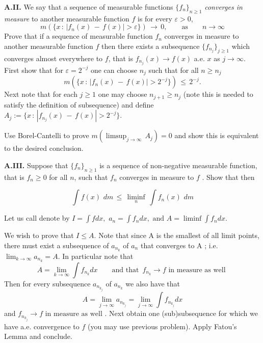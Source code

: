 {\medskip

{\bf A.II.} We say that a sequence of measurable functions $\{f_n\}_{n\geq 1}$ {\it converges in measure} to another measurable function $f$ is for every $\varepsilon >0$, 
$$ m(\{ x \,:\, |f_n(x) \,- \, f(x)| > \varepsilon \} ) \, \to \, 0, \qquad \text{as} \qquad n \to \infty $$
Prove that if a sequence of measurable function $f_n$ converges in measure to another measurable function $f$ then there exists a subsequence $\{f_{n_j}\}_{j \geq 1}$ which converges almost everywhere to $f$, that is $ f_{n_j}(x) \to f(x)$ a.e. $x$ as $ j \to \infty$.
\smallskip
{} First  show that for $\varepsilon = 2^{-j}$ one can choose $n_j$ such that for all $n \geq n_j$ 
$$ m(\{ x \,:\, |f_n(x) \,- \, f(x)| > 2^{-j} \} ) \,  \leq \, 2^{-j}. $$
Next note that for each $j \geq 1$ one may choose $ n_{j+1} \geq n_j$  (note this is needed to satisfy the definition of subsequence) and
define $A_j:=  \{ x \,:\, |f_{n_j}(x) \,- \, f(x)| > 2^{-j} \} $. 

Use Borel-Cantelli to prove $m(\limsup_{j \to \infty}\, A_j) =0$ and show this is equivalent to the desired conclusion.

\medskip

{\bf A.III.} Suppose that $\{f_n\}_{n \geq 1}$ is a sequence of non-negative measurable function, that is $f_n\geq 0$ for all $n$, such that $ f_n$ converges in measure to $f$ . Show that then 

$$ \int f(x) \, \, dm \, \leq \, \liminf_n \, \int f_n(x)\, \, dm $$

\smallskip
{}   Let us call denote by $I= \int f dx,  \, \,  a_n= \int f_n dx,  \, \,  \text{and} 
\, \,  A= \liminf \int f_n dx $.

We wish to prove that $ I \le A$. Note that since A is the smallest of all limit points, there must exist a subsequence of $a_{n_k} $ of  $a_n$ that converges to A ; i.e. 
$\lim_{k \to \infty} a_{n_k} = A.$
In particular note that $$ A = \lim_{k \to \infty} \int f_{n_k} dx \qquad \text{and that }  \, f_{n_k} \to f \text{ in measure as well } $$  
Then for every subsequence $a_{n_{k_j}}$ of $a_{n_k}$ we also have that 
 $$ A = \lim_{j \to \infty}a_{n_{k_j}} =  \lim_{j \to \infty} \int f_{n_{k_j}} dx $$ and  $f_{n_{k_j}} \to f \text{ in measure as well }.$  
Next obtain one (sub)subsequence for which we have a.e. convergence to $f$ (you may use previous problem).  Apply Fatou's Lemma and conclude.








}
